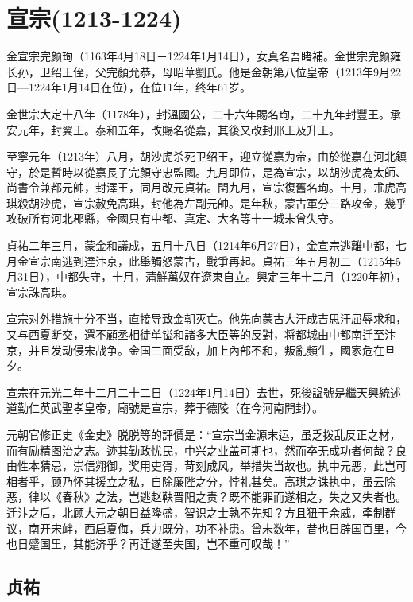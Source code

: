 
\section{宣宗\tiny(1213-1224)}

金宣宗完颜珣（1163年4月18日－1224年1月14日），女真名吾睹補。金世宗完颜雍长孙，卫绍王侄，父完顏允恭，母昭華劉氏。他是金朝第八位皇帝（1213年9月22日—1224年1月14日在位），在位11年，终年61岁。

金世宗大定十八年（1178年），封溫國公，二十六年賜名珣，二十九年封豐王。承安元年，封翼王。泰和五年，改賜名從嘉，其後又改封邢王及升王。

至寧元年（1213年）八月，胡沙虎杀死卫绍王，迎立從嘉为帝，由於從嘉在河北鎮守，於是暫時以從嘉長子完顏守忠監國。九月即位，是為宣宗，以胡沙虎為太師、尚書令兼都元帥，封澤王，同月改元貞祐。閏九月，宣宗復舊名珣。十月，朮虎高琪殺胡沙虎，宣宗赦免高琪，封他為左副元帥。是年秋，蒙古軍分三路攻金，幾乎攻破所有河北郡縣，金國只有中都、真定、大名等十一城未曾失守。

貞祐二年三月，蒙金和議成，五月十八日（1214年6月27日），金宣宗逃離中都，七月金宣宗南逃到達汴京，此舉觸怒蒙古，戰爭再起。貞祐三年五月初二（1215年5月31日），中都失守，十月，蒲鮮萬奴在遼東自立。興定三年十二月（1220年初），宣宗誅高琪。

宣宗对外措施十分不当，直接导致金朝灭亡。他先向蒙古大汗成吉思汗屈辱求和，又与西夏断交，還不顧丞相徒单镒和諸多大臣等的反對，将都城由中都南迁至汴京，并且发动侵宋战争。金国三面受敌，加上內部不和，叛亂頻生，國家危在旦夕。

宣宗在元光二年十二月二十二日（1224年1月14日）去世，死後諡號是繼天興統述道勤仁英武聖孝皇帝，廟號是宣宗，葬于德陵（在今河南開封）。

元朝官修正史《金史》脱脱等的評價是：“宣宗当金源末运，虽乏拨乱反正之材，而有励精图治之志。迹其勤政忧民，中兴之业盖可期也，然而卒无成功者何哉？良由性本猜忌，崇信翙御，奖用吏胥，苛刻成风，举措失当故也。执中元恶，此岂可相者乎，顾乃怀其援立之私，自除廉陛之分，悖礼甚矣。高琪之诛执中，虽云除恶，律以《春秋》之法，岂逃赵鞅晋阳之责？既不能罪而遂相之，失之又失者也。迁汴之后，北顾大元之朝日益隆盛，智识之士孰不先知？方且狃于余威，牵制群议，南开宋衅，西启夏侮，兵力既分，功不补患。曾未数年，昔也日辟国百里，今也日蹙国里，其能济乎？再迁遂至失国，岂不重可叹哉！”

\subsection{贞祐}


